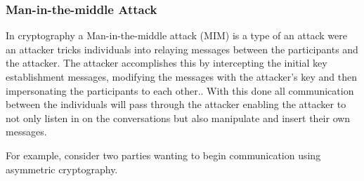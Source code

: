 \documentclass{sig-alternate}
\begin{document}
\subsubsection{Man-in-the-middle Attack}	
In cryptography a Man-in-the-middle attack (MIM) is a type of an attack were an attacker tricks individuals into relaying messages between the participants and the attacker. The attacker accomplishes this by intercepting the initial key establishment messages, modifying the messages with the attacker's key  and then impersonating the participants to each other.. With this done all communication between the individuals will pass through the attacker enabling the attacker to not only listen in on the conversations but also manipulate and insert their own messages.

For example, consider two parties wanting to begin communication using  asymmetric cryptography. 
%
%
%
%
%
%
\end{document}
